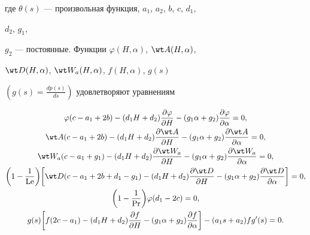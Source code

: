 где $\theta(s)$ --- произвольная функция, $a_1$, $a_2$, $b$, $c$, $d_1$, 


$d_2$, $g_1$, 


$g_2$ --- постоянные. Функции $\varphi(H,\alpha)$, $\wt A(H,\alpha)$, 


$\wt D(H,\alpha)$, $\wt W_a(H,\alpha)$, $f(H,\alpha)$, $g(s)$


$(g(s)=\frac{dp(s)}{ds})$ удовлетворяют уравнениям 


\begin{gather} 


\varphi(c-a_1+2b)-(d_1H+d_2) 


\frac{\partial\varphi}{\partial H}-(g_1\alpha+g_2) 


\frac{\partial\varphi}{\partial\alpha}=0,\notag \\ 


% 


\wt A(c-a_1+2b)-(d_1H+d_2) 


\frac{\partial\wt A}{\partial H}-(g_1\alpha+g_2) 


\frac{\partial\wt A}{\partial\alpha}=0,\notag \\ 


% 


\wt W_a(c-a_1+g_1)-(d_1H+d_2) 


\frac{\partial\wt W_a}{\partial H}- 


(g_1\alpha+g_2)\frac{\partial\wt W_a}{\partial\alpha}=0, \\ 


% 


\bigg(1-\frac{1}{\Le}\bigg)\bigg[\wt D(c-a_1+2b+d_1-g_1)- 


(d_1H+d_2)\frac{\partial\wt D}{\partial H}- 


(g_1\alpha+g_2)\frac{\partial\wt D}{\partial\alpha}\bigg]=0,\notag \\ 


% 


\bigg(1-\frac{1}{\PR}\bigg)\varphi(d_1-2c)=0,\notag \\ 


% 


g(s)\bigg[f(2c-a_1)-(d_1H+d_2)\frac{\partial f}{\partial H}- 


(g_1\alpha+g_2)\frac{\partial f}{\partial\alpha}\bigg] 


-(a_1s+a_2)f g'(s)=0.\notag 


\end{gather} 


 


